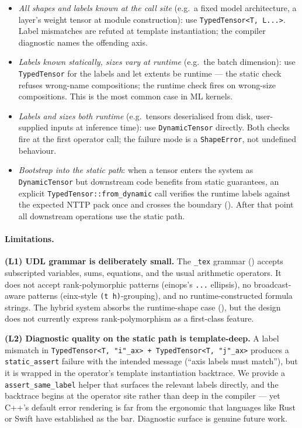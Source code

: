 \documentclass[10pt,twocolumn]{article}
\newcommand{\udltex}{\code{\_tex}}                            %
\newcommand{\code}[1]{\texttt{#1}}
\begin{document}
\begin{itemize}
  \item \emph{All shapes and labels known at the call site} (e.g.\
        a fixed model architecture, a layer's weight tensor at module
        construction): use \code{TypedTensor<T, L...>}. Label
        mismatches are refuted at template instantiation; the
        compiler diagnostic names the offending axis.
  \item \emph{Labels known statically, sizes vary at runtime} (e.g.\
        the batch dimension): use \code{TypedTensor} for the labels
        and let extents be runtime --- the static check refuses
        wrong-name compositions; the runtime check fires on
        wrong-size compositions. This is the most common case in
        ML kernels.
  \item \emph{Labels and sizes both runtime} (e.g.\ tensors
        deserialised from disk, user-supplied inputs at inference
        time): use \code{DynamicTensor} directly. Both checks fire at
        the first operator call; the failure mode is a
        \code{ShapeError}, not undefined behaviour.
  \item \emph{Bootstrap into the static path}: when a tensor enters
        the system as \code{DynamicTensor} but downstream code
        benefits from static guarantees, an explicit
        \code{TypedTensor::from\_dynamic} call verifies the runtime
        labels against the expected NTTP pack once and crosses the
        boundary (\Cref{sec:hybrid-promo}). After that point all
        downstream operations use the static path.
\end{itemize}

\paragraph{Limitations.}
\textbf{(L1) UDL grammar is deliberately small.} The \udltex{}
grammar () accepts subscripted variables,
sums, equations, and the usual arithmetic operators. It does not
accept rank-polymorphic patterns (einops's \code{...} ellipsis), no
broadcast-aware patterns (einx-style \code{(t h)}-grouping), and no
runtime-constructed formula strings. The hybrid system absorbs the
runtime-shape case (\Cref{sec:hybrid}), but the design does not
currently express rank-polymorphism as a first-class feature.

\textbf{(L2) Diagnostic quality on the static path is template-deep.}
A label mismatch in \code{TypedTensor<T, "i"\_ax> + TypedTensor<T, "j"\_ax>}
produces a \code{static\_assert} failure with the intended message
(``axis labels must match''), but it is wrapped in the operator's
template instantiation backtrace. We provide a
\code{assert\_same\_label} helper that surfaces the relevant labels
directly, and the backtrace begins at the operator site rather than
deep in the compiler --- yet C++'s default error rendering is far
from the ergonomic that languages like Rust or Swift have established
as the bar. Diagnostic surface is genuine future work.
\end{document}
